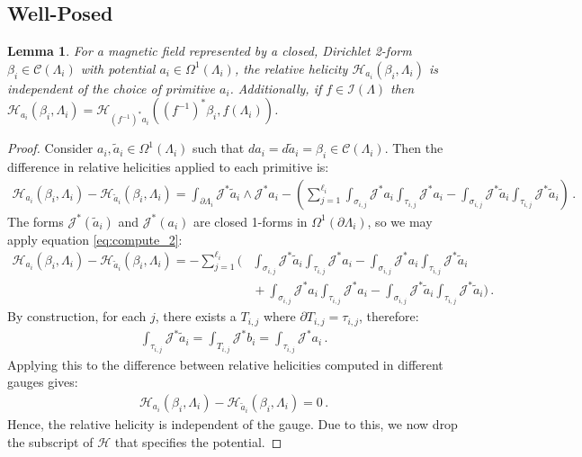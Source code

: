 \documentclass[11pt]{article}
\theoremstyle{plain}
\newtheorem{lemma}[theorem]{Lemma}
\theoremstyle{definition}
\theoremstyle{remark}
\newcommand{\ST}{\Lambda}
\newcommand{\C}{\mathcal{C} (\ST_i)}
\newcommand{\I}{\mathcal{I}(\ST)}
\begin{document}
\subsection{Well-Posed}\label{sub:Well-Posed}


\begin{lemma}\label{Lemma:well-pose}
    For a magnetic field represented by a closed, Dirichlet 2-form \(\beta _i \in \C\) with potential \(a_i \in  \Omega^1(\ST_i)\), the relative helicity \(\mathscr{H}_{a_i}( \beta_i, \ST_i)\) is independent of the choice of primitive \(a_i\). Additionally, if \(f \in \I\) then \(\mathscr{H}_{a_i}( \beta_i, \ST_i)= \mathscr{H}_{(f^{-1})^* a_i}( (f^{-1})^*  \beta_i, f(\ST_i ) )\). 
\end{lemma}

\begin{proof} 
Consider \(a_i, \tilde{a}_i\in  \Omega^1 (\ST_i)\) such that \(da_i = d \tilde{a}_i = \beta_i \in \C\). Then the difference in relative helicities applied to each primitive is:
\begin{align*}
    \mathscr{H}_{a_i}(\beta_i, \ST_i) - \mathscr{H}_{\tilde{a}_i}(\beta_i, \ST_i) = \int_{\partial \ST_i} \mathcal{J}^* \tilde{a}_i \wedge \mathcal{J}^* a_i
    - \left( \sum_{j=1}^{\ell_i} \int_{\sigma_{i,j}}  \!  \mathcal{J}^* a_i\int_{\tau_{i,j}}   \!  \mathcal{J}^* a_i
    - \int_{\sigma_{i,j}}  \!  \mathcal{J}^* \tilde{a}_i \int_{\tau_{i,j}}  \!  \mathcal{J}^* \tilde{a}_i \right)
    \, .
\end{align*}
The forms \(\mathcal{J}^* (\tilde{a}_i)\) and \(\mathcal{J}^* (a_i)\) are closed 1-forms in \(\Omega^1(\partial \ST_i)\), so we may apply equation \eqref{eq:compute_2}:
\begin{align*}
    \mathscr{H}_{a_i}(\beta_i, \ST_i) - \mathscr{H}_{\tilde{a}_i}(\beta_i, \ST_i) = -
    \sum_{j=1}^{\ell_i}  \Bigg( & \int_{\sigma_{i,j}}  \! \mathcal{J}^* \tilde{a}_i    \int_{\tau_{i,j}}  \! \mathcal{J}^*a_i
    -
    \int_{\sigma_{i,j}}  \!  \mathcal{J}^*a_i \int_{\tau_{i,j}}  \! \mathcal{J}^*\tilde{a}_i 
    \\
    & \! \! 
    + \int_{\sigma_{i,j}}  \! \mathcal{J}^*a_i \int_{\tau_{i,j}}  \! \mathcal{J}^*a_i
    - \int_{\sigma_{i,j}}  \! \mathcal{J}^*\tilde{a}_i \int_{\tau_{i,j}}  \! \mathcal{J}^*\tilde{a}_i \Bigg) \, .
\end{align*}
By construction, for each \(j\), there exists a \(T_{i,j}\) where \(\partial T_{i,j} = \tau_{i,j}\), therefore:
\begin{align*}
    \int_{\tau_{i,j}} \mathcal{J}^* \tilde{a}_i = \int_{T_{i,j}} \mathcal{J}^* b_i = \int_{\tau_{i,j}} \mathcal{J}^* a_i \, .
\end{align*}
Applying this to the difference between relative helicities computed in different gauges gives:
\begin{align*}
    \mathscr{H}_{a_i}(\beta_i, \ST_i) - \mathscr{H}_{\tilde{a}_i}(\beta_i, \ST_i) 
    = 0 \, .
\end{align*}
Hence, the relative helicity is independent of the gauge. Due to this, we now drop the subscript of \(\mathscr{H}\) that specifies the potential. 






\end{proof}
\end{document}
